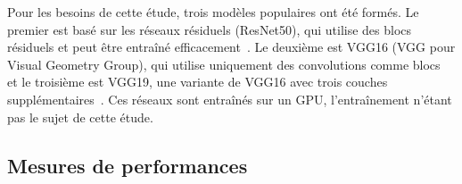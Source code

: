 \begin{table}[t]
\caption{Workload characterization }
\centering
{}%
\label{table:herofake-tasks}
\end{table}

Pour les besoins de cette étude, trois modèles populaires ont été formés. Le premier est basé sur les réseaux résiduels (ResNet50), qui utilise des blocs résiduels et peut être entraîné efficacement~\cite{NEURIPS2019_7716d0fc}. Le deuxième est VGG16 (VGG pour Visual Geometry Group), qui utilise uniquement des convolutions comme blocs~\cite{DBLP:journals/corr/SimonyanZ14a} et le troisième est VGG19, une variante de VGG16 avec trois couches supplémentaires~\cite{biom10070984}. Ces réseaux sont entraînés sur un GPU, l'entraînement n'étant pas le sujet de cette étude.

\subsection{Mesures de performances}

